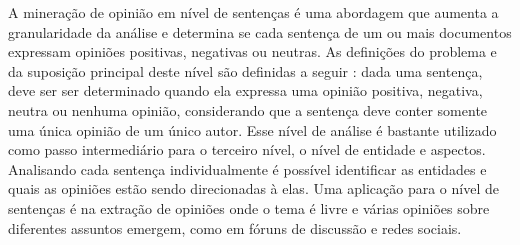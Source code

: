 \documentclass[template.tex]{subfiles}
\begin{document}

A mineração de opinião em nível de sentenças é uma abordagem que aumenta a granularidade da análise e determina se cada sentença de um ou mais documentos expressam opiniões positivas, negativas ou neutras. As definições do problema e da suposição principal deste nível são definidas a seguir \cite{bing:2012}: dada uma sentença, deve ser ser determinado quando ela expressa uma opinião positiva, negativa, neutra ou nenhuma opinião, considerando que a sentença deve conter somente uma única opinião de um único autor. Esse nível de análise é bastante utilizado como passo intermediário para o terceiro nível, o nível de entidade e aspectos. Analisando cada sentença individualmente é possível identificar as entidades e quais as opiniões estão sendo direcionadas à elas.  Uma aplicação para o nível de sentenças é na extração de opiniões onde o tema é livre e várias opiniões sobre diferentes assuntos emergem, como em fóruns de discussão e redes sociais. 
\end{document}
